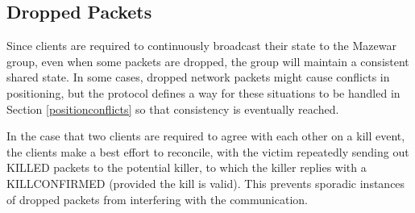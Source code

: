 \documentclass[11pt]{article} %
\begin{document}
\subsection{Dropped Packets}
Since clients are required to continuously broadcast their state to the Mazewar
group, even when some packets are dropped, the group will maintain a consistent
shared state. In some cases, dropped network packets might cause conflicts in
positioning, but the protocol defines a way for these situations to be handled
in Section \ref{positionconflicts} so that consistency is eventually reached.

	In the case that two clients are required to agree with each other on a kill
event, the clients make a best effort to reconcile, with the victim repeatedly
sending out KILLED packets to the potential killer, to which the killer replies
with a KILLCONFIRMED (provided the kill is valid). This prevents sporadic
instances of dropped packets from interfering with the communication. 
\end{document}
